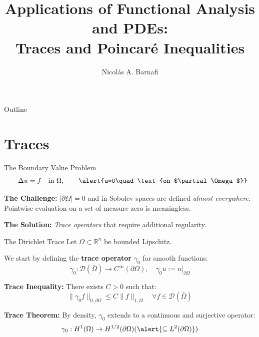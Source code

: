 \documentclass[aspectratio=169]{beamer}
\title[Traces and Poincar\'e]{Applications of Functional Analysis and PDEs: \\ Traces and Poincar\'e Inequalities}
\author{Nicol\'as A. Barnafi}
\date{}
\begin{document}
\begin{frame}
    \titlepage
\end{frame}

\begin{frame}{Outline}
    \tableofcontents
\end{frame}

\section{Traces}

\begin{frame}{The Boundary Value Problem}
    $$ -\Delta u = f\quad\text{in $\Omega$}, \qquad \alert{u=0\quad\text{on $\partial\Omega$}}$$
    \pause

    \vspace{0.2cm}
    \textbf{The Challenge:}
    $|\partial\Omega|=0$ and in Sobolev spaces are defined \textit{almost everywhere}. 
    Pointwise evaluation on a set of measure zero is meaningless.

    \vspace{0.2cm}
    \textbf{The Solution:}
    \emph{Trace operators} that require additional regularity.
\end{frame}

\begin{frame}{The Dirichlet Trace}
    Let $\Omega \subset \mathbb{R}^n$ be bounded Lipschitz.

    We start by defining the \textbf{trace operator} $\gamma_0$ for smooth functions:
    \[
        \gamma_0 : \mathcal{D}(\bar{\Omega}) \to C^\infty(\partial\Omega), \quad \gamma_0 u := u|_{\partial\Omega} \text{}
    \]

    \begin{block}{}
        \textbf{Trace Inequality:} There exists $C > 0$ such that:
        \[
            \|\gamma_0 f\|_{0,\partial\Omega} \le C\|f\|_{1,\Omega} \quad \forall f \in \mathcal{D}(\bar{\Omega}) \text{}
        \]
    \end{block}

    \textbf{Trace Theorem:} By density, $\gamma_0$ extends to a continuous and surjective operator:
    \[
        \gamma_0 : H^1(\Omega) \to H^{1/2}(\partial\Omega) (\alert{\subseteq L^2(\partial\Omega)})
    \]
\end{frame}
\end{document}
